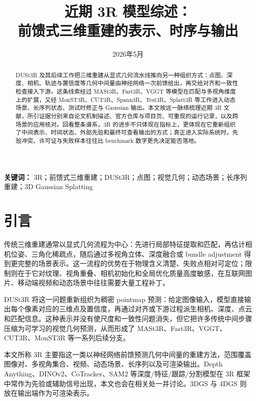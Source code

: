 \documentclass[UTF8,a4paper,zihao=-4,fontset=windows]{ctexart}
\title{\bfseries 近期 3R 模型综述：\\前馈式三维重建的表示、时序与输出}
\author{}
\date{2026年5月}
\begin{document}
\maketitle

\begin{abstract}
DUSt3R 及其后续工作把三维重建从显式几何流水线推向另一种组织方式：点图、深度、相机、轨迹与置信度等几何中间量由神经网络一次前馈给出，再交给对齐和一致性检查接入下游。这条线索经过 MASt3R、Fast3R、VGGT 等模型在匹配与多视角维度上的扩展，又经 MonST3R、CUT3R、Spann3R、Test3R、Splatt3R 等工作进入动态场景、长序列状态、测试时修正与 Gaussian 输出。本文按这一脉络梳理近期 3R 文献，所引证据分别来自论文机制描述、官方仓库与项目页、可重现的运行记录，以及跨场景的应用核对。回看整条谱系，3R 的进步不只体现在指标上，更体现在它重新组织了中间表示、时间状态、外部先验和最终可查看输出的方式；真正进入实际系统时，先验冲突、许可证与失败样本往往比 benchmark 数字更先决定能否落地。
\end{abstract}

\noindent\textbf{关键词：} 3R；前馈式三维重建；DUSt3R；点图；视觉几何；动态场景；长序列重建；3D Gaussian Splatting

\section{引言}

传统三维重建通常以显式几何流程为中心：先进行局部特征提取和匹配，再估计相机位姿、三角化稀疏点，随后通过多视角立体、深度融合或 bundle adjustment 得到更完整的场景表示。这一流程的优势在于物理含义清楚、失败点相对可定位；限制则在于它对纹理、视角重叠、相机初始化和全局优化质量高度敏感，在互联网图片、移动端视频和动态场景中往往需要大量工程补丁。

DUSt3R 将这一问题重新组织为稠密 pointmap 预测：给定图像输入，模型直接输出每个像素对应的三维点及置信度，再通过对齐或下游过程派生相机、深度、点云和匹配信息\citep{dust3r}。这种表示并没有使尺度和一致性问题消失，但它把许多传统中间步骤压缩为可学习的视觉几何预测，从而形成了 MASt3R、Fast3R、VGGT、CUT3R、MonST3R 等一系列后续分支\citep{mast3r,fast3r,vggt,cut3r,monst3r}。

本文所称 3R 主要指这一类以神经网络前馈预测几何中间量的重建方法，范围覆盖图像对、多视角集合、视频、动态场景、长序列以及可渲染输出。Depth Anything、DINOv2、CoTracker、SAM2 等深度/特征/跟踪/分割模型在 3R 框架中常作为先验或辅助信号出现，本文也会在相关处一并讨论\citep{depth_anything,depth_anything_v2,dinov2,cotracker,sam2}。3DGS 与 4DGS 则放在输出端作为可渲染表示\citep{gaussian_splatting_3d,gaussian_splatting_4d}。
\end{document}
